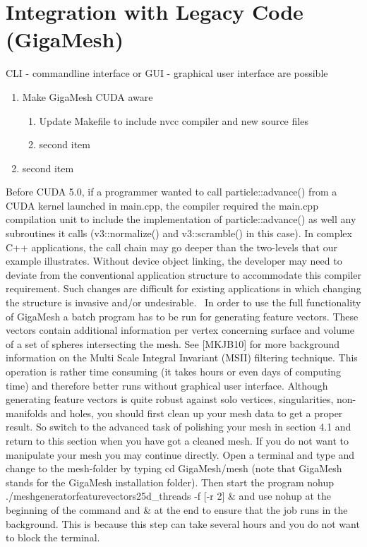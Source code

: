 \documentclass[openany]{book}
\begin{document}
\section{Integration with Legacy Code (GigaMesh)}
CLI - commandline interface or GUI - graphical user interface are possible
\begin{enumerate}
\item Make GigaMesh CUDA aware
	\begin{enumerate}
	\item Update Makefile to include nvcc compiler and new source files
	\item second item
	\end{enumerate}
\item second item
\end{enumerate}
Before CUDA 5.0, if a programmer wanted to call particle::advance() from a CUDA 
kernel launched in main.cpp, the compiler required the main.cpp compilation unit 
to include the implementation of particle::advance() as well any subroutines it 
calls (v3::normalize() and v3::scramble() in this case). In complex C++ 
applications, the call chain may go deeper than the two-levels that our example 
illustrates. Without device object linking, the developer may need to deviate 
from the conventional application structure to accommodate this compiler 
requirement. Such changes are difficult for existing applications in which 
changing the structure is invasive and/or undesirable.~\cite{Cuda14}
In order to use the full functionality of GigaMesh a batch program has to be run 
for generating feature vectors. These vectors contain additional information per 
vertex concerning surface and volume of a set of spheres intersecting the mesh. 
See [MKJB10] for more background information on the Multi Scale Integral 
Invariant (MSII) filtering technique. This operation is rather time consuming 
(it takes hours or even days of computing time) and therefore better runs 
without graphical user interface. Although generating feature vectors is quite 
robust against solo vertices, singularities, non-manifolds and holes, you should 
first clean up your mesh data to get a proper result. So switch to the advanced 
task of polishing your mesh in section 4.1 and return to this section when you 
have got a cleaned mesh. If you do not want to manipulate your mesh you may 
continue directly. Open a terminal and type and change to the mesh-folder by 
typing cd GigaMesh/mesh (note that GigaMesh stands for the GigaMesh installation 
folder). Then start the program nohup ./meshgeneratorfeaturevectors25d\_threads 
-f [-r 2] \& and use nohup at the beginning of the command and \& at the end to 
ensure that the job runs in the background. This is because this step can take 
several hours and you do not want to block the terminal.~\cite[p.~19]{Giga17}
\end{document}
